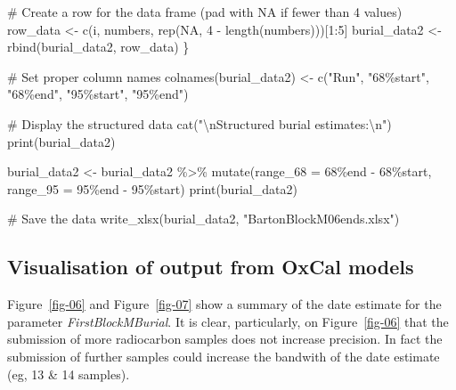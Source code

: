\documentclass[
]{agujournal2019}
\newenvironment{Shaded}{\begin{snugshade}}{\end{snugshade}}
\newcommand{\AttributeTok}[1]{\textcolor[rgb]{0.40,0.45,0.13}{#1}}
\newcommand{\CommentTok}[1]{\textcolor[rgb]{0.37,0.37,0.37}{#1}}
\newcommand{\ConstantTok}[1]{\textcolor[rgb]{0.56,0.35,0.01}{#1}}
\newcommand{\DecValTok}[1]{\textcolor[rgb]{0.68,0.00,0.00}{#1}}
\newcommand{\FunctionTok}[1]{\textcolor[rgb]{0.28,0.35,0.67}{#1}}
\newcommand{\NormalTok}[1]{\textcolor[rgb]{0.00,0.23,0.31}{#1}}
\newcommand{\OtherTok}[1]{\textcolor[rgb]{0.00,0.23,0.31}{#1}}
\newcommand{\SpecialCharTok}[1]{\textcolor[rgb]{0.37,0.37,0.37}{#1}}
\newcommand{\StringTok}[1]{\textcolor[rgb]{0.13,0.47,0.30}{#1}}
\begin{document}
\begin{Shaded}
\begin{Highlighting}[]
  \CommentTok{\# Create a row for the data frame (pad with NA if fewer than 4 values)}
\NormalTok{  row\_data }\OtherTok{\textless{}{-}} \FunctionTok{c}\NormalTok{(i, numbers, }\FunctionTok{rep}\NormalTok{(}\ConstantTok{NA}\NormalTok{, }\DecValTok{4} \SpecialCharTok{{-}} \FunctionTok{length}\NormalTok{(numbers)))[}\DecValTok{1}\SpecialCharTok{:}\DecValTok{5}\NormalTok{]}
\NormalTok{  burial\_data2 }\OtherTok{\textless{}{-}} \FunctionTok{rbind}\NormalTok{(burial\_data2, row\_data)}
\NormalTok{\}}

\CommentTok{\# Set proper column names}
\FunctionTok{colnames}\NormalTok{(burial\_data2) }\OtherTok{\textless{}{-}} \FunctionTok{c}\NormalTok{(}\StringTok{"Run"}\NormalTok{, }\StringTok{"68\%start"}\NormalTok{, }\StringTok{"68\%end"}\NormalTok{, }\StringTok{"95\%start"}\NormalTok{, }\StringTok{"95\%end"}\NormalTok{)}

\CommentTok{\# Display the structured data}
\FunctionTok{cat}\NormalTok{(}\StringTok{"}\SpecialCharTok{\textbackslash{}n}\StringTok{Structured burial estimates:}\SpecialCharTok{\textbackslash{}n}\StringTok{"}\NormalTok{)}
\FunctionTok{print}\NormalTok{(burial\_data2)}


\NormalTok{burial\_data2 }\OtherTok{\textless{}{-}}\NormalTok{ burial\_data2 }\SpecialCharTok{\%\textgreater{}\%}
  \FunctionTok{mutate}\NormalTok{(}\AttributeTok{range\_68 =} \StringTok{\textasciigrave{}}\AttributeTok{68\%end}\StringTok{\textasciigrave{}} \SpecialCharTok{{-}} \StringTok{\textasciigrave{}}\AttributeTok{68\%start}\StringTok{\textasciigrave{}}\NormalTok{,}
         \AttributeTok{range\_95 =} \StringTok{\textasciigrave{}}\AttributeTok{95\%end}\StringTok{\textasciigrave{}} \SpecialCharTok{{-}} \StringTok{\textasciigrave{}}\AttributeTok{95\%start}\StringTok{\textasciigrave{}}\NormalTok{)}
\FunctionTok{print}\NormalTok{(burial\_data2)}

\CommentTok{\# Save the data}
\FunctionTok{write\_xlsx}\NormalTok{(burial\_data2, }\StringTok{"BartonBlockM06ends.xlsx"}\NormalTok{)}
\end{Highlighting}
\end{Shaded}

\subsection{Visualisation of output from OxCal
models}\label{visualisation-of-output-from-oxcal-models}

Figure~\ref{fig-06} and Figure~\ref{fig-07} show a summary of the date
estimate for the parameter \emph{FirstBlockMBurial}. It is clear,
particularly, on Figure~\ref{fig-06} that the submission of more
radiocarbon samples does not increase precision. In fact the submission
of further samples could increase the bandwith of the date estimate (eg,
13 \& 14 samples).
\end{document}
